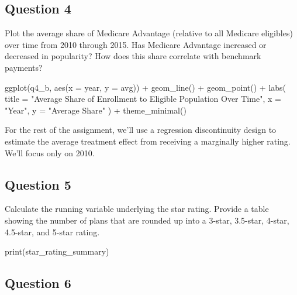 \documentclass[
]{article}
\newenvironment{Shaded}{\begin{snugshade}}{\end{snugshade}}
\newcommand{\AttributeTok}[1]{\textcolor[rgb]{0.40,0.45,0.13}{#1}}
\newcommand{\FunctionTok}[1]{\textcolor[rgb]{0.28,0.35,0.67}{#1}}
\newcommand{\NormalTok}[1]{\textcolor[rgb]{0.00,0.23,0.31}{#1}}
\newcommand{\SpecialCharTok}[1]{\textcolor[rgb]{0.37,0.37,0.37}{#1}}
\newcommand{\StringTok}[1]{\textcolor[rgb]{0.13,0.47,0.30}{#1}}
\begin{document}
\subsection{Question 4}\label{question-4}

Plot the average share of Medicare Advantage (relative to all Medicare
eligibles) over time from 2010 through 2015. Has Medicare Advantage
increased or decreased in popularity? How does this share correlate with
benchmark payments?

\begin{Shaded}
\begin{Highlighting}[]
\FunctionTok{ggplot}\NormalTok{(q4\_b, }\FunctionTok{aes}\NormalTok{(}\AttributeTok{x =}\NormalTok{ year, }\AttributeTok{y =}\NormalTok{ avg)) }\SpecialCharTok{+}
    \FunctionTok{geom\_line}\NormalTok{() }\SpecialCharTok{+}
    \FunctionTok{geom\_point}\NormalTok{() }\SpecialCharTok{+}
    \FunctionTok{labs}\NormalTok{(}
        \AttributeTok{title =} \StringTok{"Average Share of Enrollment to Eligible Population Over Time"}\NormalTok{,}
        \AttributeTok{x =} \StringTok{"Year"}\NormalTok{,}
        \AttributeTok{y =} \StringTok{"Average Share"}
\NormalTok{    ) }\SpecialCharTok{+}
    \FunctionTok{theme\_minimal}\NormalTok{()}
\end{Highlighting}
\end{Shaded}

For the rest of the assignment, we'll use a regression discontinuity
design to estimate the average treatment effect from receiving a
marginally higher rating. We'll focus only on 2010.

\subsection{Question 5}\label{question-5}

Calculate the running variable underlying the star rating. Provide a
table showing the number of plans that are rounded up into a 3-star,
3.5-star, 4-star, 4.5-star, and 5-star rating.

\begin{Shaded}
\begin{Highlighting}[]
\FunctionTok{print}\NormalTok{(star\_rating\_summary)}
\end{Highlighting}
\end{Shaded}

\subsection{Question 6}\label{question-6}
\end{document}
